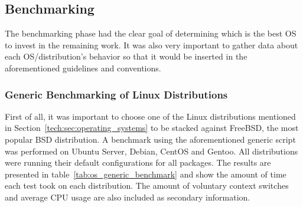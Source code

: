 \subsection{Benchmarking}
The benchmarking phase had the clear goal of determining which is the best OS to invest in the remaining work. It was also very important to gather data about each OS/distribution's behavior so that it would be inserted in the aforementioned guidelines and conventions.

\subsubsection{Generic Benchmarking of Linux Distributions}
First of all, it was important to choose one of the Linux distributions mentioned in Section~\ref{tech:sec:operating_systems} to be stacked against FreeBSD, the most popular BSD distribution. A benchmark using the aforementioned generic script was performed on Ubuntu Server, Debian, CentOS and Gentoo. All distributions were running their default configurations for all packages. The results are presented in table~\ref{tab:os_generic_benchmark} and show the amount of time each test took on each distribution. The amount of voluntary context switches and average CPU usage are also included as secondary information.
